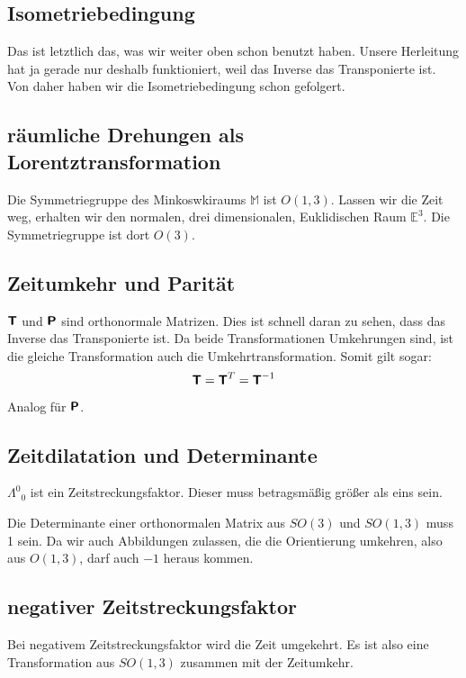 \subsection{Isometriebedingung}

Das ist letztlich das, was wir weiter oben schon benutzt haben. Unsere
Herleitung hat ja gerade nur deshalb funktioniert, weil das Inverse das
Transponierte ist. Von daher haben wir die Isometriebedingung schon gefolgert.

\subsection{räumliche Drehungen als Lorentztransformation}

Die Symmetriegruppe des Minkoswkiraums $\mathbb M$ ist $O(1, 3)$. Lassen wir
die Zeit weg, erhalten wir den normalen, drei dimensionalen, Euklidischen Raum
$\mathbb E^3$. Die Symmetriegruppe ist dort $O(3)$.

\subsection{Zeitumkehr und Parität}

$\boldsymbol{\mathsf{T}}$ und $\boldsymbol{\mathsf{P}}$ sind orthonormale Matrizen. Dies ist schnell daran zu
sehen, dass das Inverse das Transponierte ist. Da beide Transformationen
Umkehrungen sind, ist die gleiche Transformation auch die Umkehrtransformation.
Somit gilt sogar:
\[
	\boldsymbol{\mathsf{T}} = \boldsymbol{\mathsf{T}}^T = \boldsymbol{\mathsf{T}}^{-1}
\]
Analog für $\boldsymbol{\mathsf{P}}$.

\subsection{Zeitdilatation und Determinante}

$\Lambda^0{}_0$ ist ein Zeitstreckungsfaktor. Dieser muss betragsmäßig größer
als eins sein.

Die Determinante einer orthonormalen Matrix aus $SO(3)$ und $SO(1, 3)$ muss 1
sein. Da wir auch Abbildungen zulassen, die die Orientierung umkehren, also aus
$O(1, 3)$, darf auch $-1$ heraus kommen.

\subsection{negativer Zeitstreckungsfaktor}

Bei negativem Zeitstreckungsfaktor wird die Zeit umgekehrt. Es ist also eine
Transformation aus $SO(1, 3)$ zusammen mit der Zeitumkehr.

